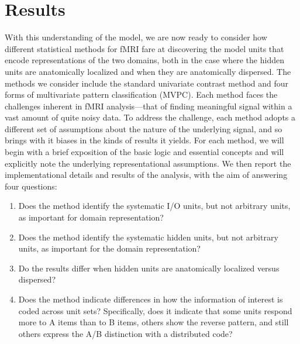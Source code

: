 \section{Results}

With this understanding of the model, we are now ready to consider how different statistical methods for fMRI fare at discovering the model units that encode representations of the two domains, both in the case where the hidden units are anatomically localized and when they are anatomically dispersed. The methods we consider include the standard univariate contrast method and four forms of multivariate pattern classification (MVPC). Each method faces the challenges inherent in fMRI analysis---that of finding meaningful signal within a vast amount of quite noisy data. To address the challenge, each method adopts a different set of assumptions about the nature of the underlying signal, and so brings with it biases in the kinds of results it yields. For each method, we will begin with a brief exposition of the basic logic and essential concepts and will explicitly note the underlying representational assumptions. We then report the implementational details and results of the analysis, with the aim of answering four questions:

\begin{enumerate}
\item Does the method identify the systematic I/O units, but not arbitrary units, as important for domain representation?
\item Does the method identify the systematic hidden units, but not arbitrary units, as important for the domain representation?
\item Do the results differ when hidden units are anatomically localized versus dispersed?
\item Does the method indicate differences in how the information of interest is coded across unit sets? Specifically, does it indicate that some units respond more to A items than to B items, others show the reverse pattern, and still others express the A/B distinction with a distributed code? 
\end{enumerate}
